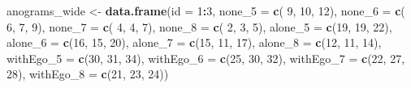 \documentclass[
]{article}
\newenvironment{Shaded}{\begin{snugshade}}{\end{snugshade}}
\newcommand{\DataTypeTok}[1]{\textcolor[rgb]{0.13,0.29,0.53}{#1}}
\newcommand{\DecValTok}[1]{\textcolor[rgb]{0.00,0.00,0.81}{#1}}
\newcommand{\KeywordTok}[1]{\textcolor[rgb]{0.13,0.29,0.53}{\textbf{#1}}}
\newcommand{\NormalTok}[1]{#1}
\newcommand{\OperatorTok}[1]{\textcolor[rgb]{0.81,0.36,0.00}{\textbf{#1}}}
\newcommand{\StringTok}[1]{\textcolor[rgb]{0.31,0.60,0.02}{#1}}
\begin{document}
\begin{Shaded}
\begin{Highlighting}[]
\NormalTok{anograms_wide <-}\StringTok{ }\KeywordTok{data.frame}\NormalTok{(}\DataTypeTok{id =} \DecValTok{1}\OperatorTok{:}\DecValTok{3}\NormalTok{,}
                            \DataTypeTok{none_5    =} \KeywordTok{c}\NormalTok{( }\DecValTok{9}\NormalTok{, }\DecValTok{10}\NormalTok{, }\DecValTok{12}\NormalTok{),}
                            \DataTypeTok{none_6    =} \KeywordTok{c}\NormalTok{( }\DecValTok{6}\NormalTok{,  }\DecValTok{7}\NormalTok{,  }\DecValTok{9}\NormalTok{),}
                            \DataTypeTok{none_7    =} \KeywordTok{c}\NormalTok{( }\DecValTok{4}\NormalTok{,  }\DecValTok{4}\NormalTok{,  }\DecValTok{7}\NormalTok{),}
                            \DataTypeTok{none_8    =} \KeywordTok{c}\NormalTok{( }\DecValTok{2}\NormalTok{,  }\DecValTok{3}\NormalTok{,  }\DecValTok{5}\NormalTok{),}
                            \DataTypeTok{alone_5   =} \KeywordTok{c}\NormalTok{(}\DecValTok{19}\NormalTok{, }\DecValTok{19}\NormalTok{, }\DecValTok{22}\NormalTok{),}
                            \DataTypeTok{alone_6   =} \KeywordTok{c}\NormalTok{(}\DecValTok{16}\NormalTok{, }\DecValTok{15}\NormalTok{, }\DecValTok{20}\NormalTok{),}
                            \DataTypeTok{alone_7   =} \KeywordTok{c}\NormalTok{(}\DecValTok{15}\NormalTok{, }\DecValTok{11}\NormalTok{, }\DecValTok{17}\NormalTok{),}
                            \DataTypeTok{alone_8   =} \KeywordTok{c}\NormalTok{(}\DecValTok{12}\NormalTok{, }\DecValTok{11}\NormalTok{, }\DecValTok{14}\NormalTok{),}
                            \DataTypeTok{withEgo_5 =} \KeywordTok{c}\NormalTok{(}\DecValTok{30}\NormalTok{, }\DecValTok{31}\NormalTok{, }\DecValTok{34}\NormalTok{),}
                            \DataTypeTok{withEgo_6 =} \KeywordTok{c}\NormalTok{(}\DecValTok{25}\NormalTok{, }\DecValTok{30}\NormalTok{, }\DecValTok{32}\NormalTok{),}
                            \DataTypeTok{withEgo_7 =} \KeywordTok{c}\NormalTok{(}\DecValTok{22}\NormalTok{, }\DecValTok{27}\NormalTok{, }\DecValTok{28}\NormalTok{),}
                            \DataTypeTok{withEgo_8 =} \KeywordTok{c}\NormalTok{(}\DecValTok{21}\NormalTok{, }\DecValTok{23}\NormalTok{, }\DecValTok{24}\NormalTok{))}


\end{Highlighting}
\end{Shaded}
\end{document}
